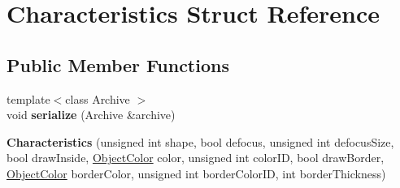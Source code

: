 \hypertarget{structCharacteristics}{}\section{Characteristics Struct Reference}
\label{structCharacteristics}
\subsection*{Public Member Functions}
\begin{DoxyCompactItemize}
\item 
\hypertarget{structCharacteristics_a9a27d2d685207d583d90715ed1dfa4dc}{}{\footnotesize template$<$class Archive $>$ }\\void {\bfseries serialize} (Archive \&archive)\label{structCharacteristics_a9a27d2d685207d583d90715ed1dfa4dc}

\item 
\hypertarget{structCharacteristics_aa36f20424280a476153311b495ab952c}{}{\bfseries Characteristics} (unsigned int shape, bool defocus, unsigned int defocus\+Size, bool draw\+Inside, \hyperlink{structObjectColor}{Object\+Color} color, unsigned int color\+I\+D, bool draw\+Border, \hyperlink{structObjectColor}{Object\+Color} border\+Color, unsigned int border\+Color\+I\+D, int border\+Thickness)\label{structCharacteristics_aa36f20424280a476153311b495ab952c}

\end{DoxyCompactItemize}
